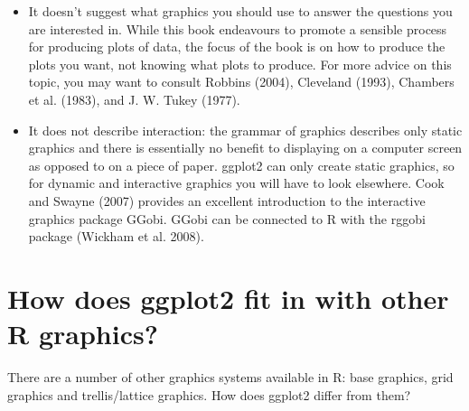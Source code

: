 \begin{itemize}
\item
  It doesn't suggest what graphics you should use to answer the
  questions you are interested in. While this book endeavours to promote
  a sensible process for producing plots of data, the focus of the book
  is on how to produce the plots you want, not knowing what plots to
  produce. For more advice on this topic, you may want to consult
  Robbins (2004), Cleveland (1993), Chambers et al. (1983), and J. W.
  Tukey (1977).
\item
  It does not describe interaction: the grammar of graphics describes
  only static graphics and there is essentially no benefit to displaying
  on a computer screen as opposed to on a piece of paper. ggplot2 can
  only create static graphics, so for dynamic and interactive graphics
  you will have to look elsewhere. Cook and Swayne (2007) provides an
  excellent introduction to the interactive graphics package GGobi.
  GGobi can be connected to R with the rggobi package (Wickham et al.
  2008).
\end{itemize}

\section{How does ggplot2 fit in with other R graphics?}

There are a number of other graphics systems available in R: base
graphics, grid graphics and trellis/lattice graphics. How does ggplot2
differ from them?


